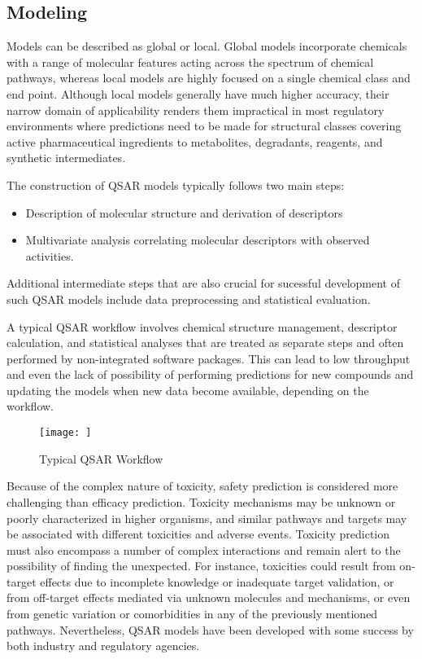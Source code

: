 \subsection{Modeling}
Models can be described as global or local. Global models incorporate chemicals with a range of molecular features acting across the spectrum of chemical pathways, whereas local models are highly focused on a single chemical class and end point. Although local models generally have much higher accuracy, their narrow domain of applicability renders them impractical in most regulatory environments where predictions need to be made for structural classes covering active pharmaceutical ingredients to metabolites, degradants, reagents, and synthetic intermediates. \cite{Kruhlak2012}

The construction of QSAR models typically follows two main steps:
\begin{itemize}
\item Description of molecular structure and derivation of descriptors
\item Multivariate analysis correlating molecular descriptors with observed activities. 
\end{itemize}
Additional intermediate steps that are also crucial for sucessful development of such QSAR models include data preprocessing and statistical evaluation. \cite{Nantasenamat2009}

A typical QSAR workflow involves chemical structure management, descriptor calculation, and statistical analyses that are treated as separate steps and often performed by non-integrated software packages. This can lead to low throughput and even the lack of possibility of performing predictions for new compounds and updating the models when new data become available, depending on the workflow.

\begin{figure}[h,t]
  \caption{Typical QSAR Workflow}
  \centering
   \texttt{[image: ]}
\end{figure}

Because of the complex nature of toxicity, safety prediction is considered more challenging than efficacy prediction. Toxicity mechanisms may be unknown or poorly characterized in higher organisms, and similar pathways and targets may be associated with different toxicities and adverse events. Toxicity prediction must also encompass a number of complex interactions and remain alert to the possibility of finding the unexpected. For instance, toxicities could result from on-target effects due to incomplete knowledge or inadequate target validation, or from off-target effects mediated via unknown molecules and mechanisms, or even from genetic variation or comorbidities in any of the previously mentioned pathways. Nevertheless, QSAR models have been developed with some success by both industry and regulatory agencies.\cite{Kruhlak2012}

